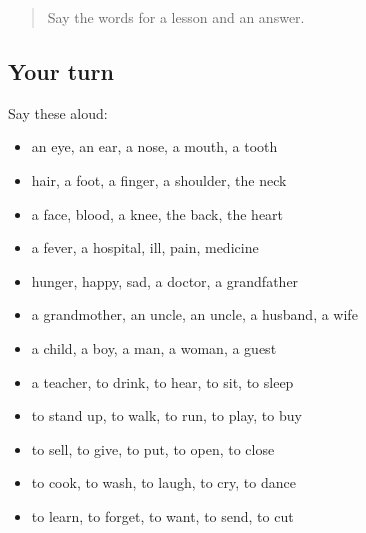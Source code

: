 \label{lesson:AR-R74-first-pass-the-body-family-verbs-and-food}



\begin{quote}
Say the words for a lesson and an answer.
\end{quote}

\subsection*{Your turn}
Say these aloud:

\begin{itemize}
\raggedright
  \item an eye, an ear, a nose, a mouth, a tooth
  \item hair, a foot, a finger, a shoulder, the neck
  \item a face, blood, a knee, the back, the heart
  \item a fever, a hospital, ill, pain, medicine
  \item hunger, happy, sad, a doctor, a grandfather
  \item a grandmother, an uncle, an uncle, a husband, a wife
  \item a child, a boy, a man, a woman, a guest
  \item a teacher, to drink, to hear, to sit, to sleep
  \item to stand up, to walk, to run, to play, to buy
  \item to sell, to give, to put, to open, to close
  \item to cook, to wash, to laugh, to cry, to dance
  \item to learn, to forget, to want, to send, to cut
\end{itemize}

